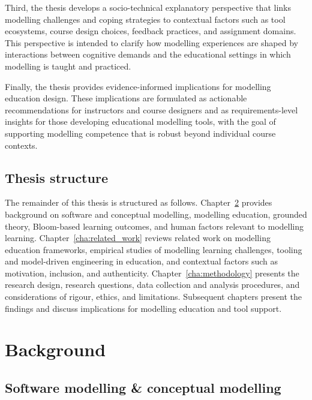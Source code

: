 Third, the thesis develops a socio-technical explanatory perspective that links modelling challenges and coping strategies to contextual factors such as tool ecosystems, course design choices, feedback practices, and assignment domains. This perspective is intended to clarify how modelling experiences are shaped by interactions between cognitive demands and the educational settings in which modelling is taught and practiced.

Finally, the thesis provides evidence-informed implications for modelling education design. These implications are formulated as actionable recommendations for instructors and course designers and as requirements-level insights for those developing educational modelling tools, with the goal of supporting modelling competence that is robust beyond individual course contexts.


\section{Thesis structure}
\label{sec:intro_structure}

The remainder of this thesis is structured as follows. Chapter~\ref{cha:background} provides background on software and conceptual modelling, modelling education, grounded theory, Bloom-based learning outcomes, and human factors relevant to modelling learning. Chapter~\ref{cha:related_work} reviews related work on modelling education frameworks, empirical studies of modelling learning challenges, tooling and model-driven engineering in education, and contextual factors such as motivation, inclusion, and authenticity. Chapter~\ref{cha:methodology} presents the research design, research questions, data collection and analysis procedures, and considerations of rigour, ethics, and limitations. Subsequent chapters present the findings and discuss implications for modelling education and tool support.


%

\chapter{Background}
\label{cha:background}

\section{Software modelling \& conceptual modelling}
\label{sec:software_modelling_conceptual}

